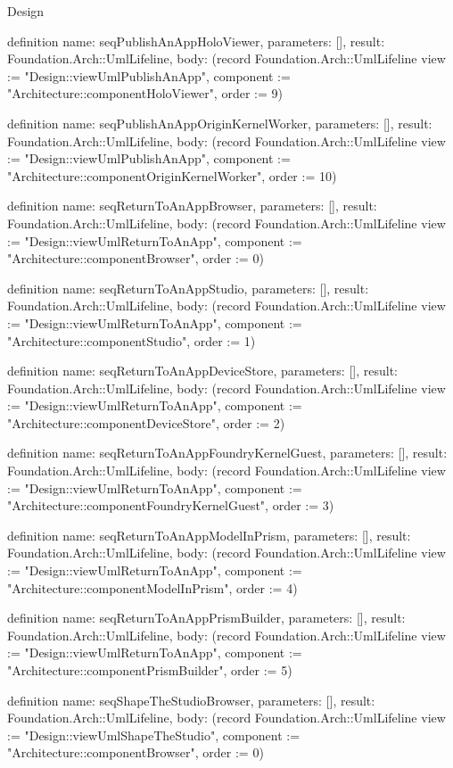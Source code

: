 \begin{lexlean}{Design}
\begin{semanticmodule}
definition{
  name: seqPublishAnAppHoloViewer,
  parameters: [],
  result: Foundation.Arch::UmlLifeline,
  body: (record Foundation.Arch::UmlLifeline {view := "Design::viewUmlPublishAnApp", component := "Architecture::componentHoloViewer", order := 9})
}

definition{
  name: seqPublishAnAppOriginKernelWorker,
  parameters: [],
  result: Foundation.Arch::UmlLifeline,
  body: (record Foundation.Arch::UmlLifeline {view := "Design::viewUmlPublishAnApp", component := "Architecture::componentOriginKernelWorker", order := 10})
}

definition{
  name: seqReturnToAnAppBrowser,
  parameters: [],
  result: Foundation.Arch::UmlLifeline,
  body: (record Foundation.Arch::UmlLifeline {view := "Design::viewUmlReturnToAnApp", component := "Architecture::componentBrowser", order := 0})
}

definition{
  name: seqReturnToAnAppStudio,
  parameters: [],
  result: Foundation.Arch::UmlLifeline,
  body: (record Foundation.Arch::UmlLifeline {view := "Design::viewUmlReturnToAnApp", component := "Architecture::componentStudio", order := 1})
}

definition{
  name: seqReturnToAnAppDeviceStore,
  parameters: [],
  result: Foundation.Arch::UmlLifeline,
  body: (record Foundation.Arch::UmlLifeline {view := "Design::viewUmlReturnToAnApp", component := "Architecture::componentDeviceStore", order := 2})
}

definition{
  name: seqReturnToAnAppFoundryKernelGuest,
  parameters: [],
  result: Foundation.Arch::UmlLifeline,
  body: (record Foundation.Arch::UmlLifeline {view := "Design::viewUmlReturnToAnApp", component := "Architecture::componentFoundryKernelGuest", order := 3})
}

definition{
  name: seqReturnToAnAppModelInPrism,
  parameters: [],
  result: Foundation.Arch::UmlLifeline,
  body: (record Foundation.Arch::UmlLifeline {view := "Design::viewUmlReturnToAnApp", component := "Architecture::componentModelInPrism", order := 4})
}

definition{
  name: seqReturnToAnAppPrismBuilder,
  parameters: [],
  result: Foundation.Arch::UmlLifeline,
  body: (record Foundation.Arch::UmlLifeline {view := "Design::viewUmlReturnToAnApp", component := "Architecture::componentPrismBuilder", order := 5})
}

definition{
  name: seqShapeTheStudioBrowser,
  parameters: [],
  result: Foundation.Arch::UmlLifeline,
  body: (record Foundation.Arch::UmlLifeline {view := "Design::viewUmlShapeTheStudio", component := "Architecture::componentBrowser", order := 0})
}


\end{semanticmodule}
\end{lexlean}
